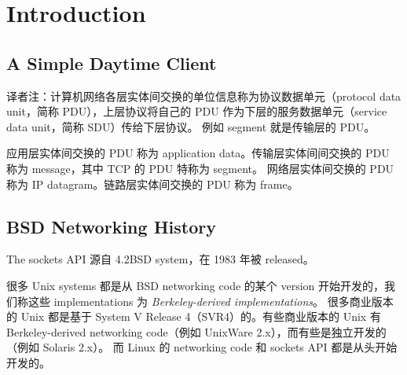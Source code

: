 \section{Introduction}

  \subsection{A Simple Daytime Client}

    译者注：计算机网络各层实体间交换的单位信息称为协议数据单元（protocol data unit，简称 PDU），上层协议将自己的 PDU 作为下层的服务数据单元（service data unit，简称 SDU）传给下层协议。
    例如 segment 就是传输层的 PDU。

    应用层实体间交换的 PDU 称为 application data。传输层实体间间交换的 PDU 称为 message，其中 TCP 的 PDU 特称为 segment。
    网络层实体间交换的 PDU 称为 IP datagram。链路层实体间交换的 PDU 称为 frame。

  \subsection{BSD Networking History}

    The sockets API 源自 4.2BSD system，在 1983 年被 released。
    
    很多 Unix systems 都是从 BSD networking code 的某个 version 开始开发的，我们称这些 implementations 为 \textit{Berkeley-derived implementations}。
    很多商业版本的 Unix 都是基于 System V Release 4（SVR4）的。有些商业版本的 Unix 有 Berkeley-derived networking code（例如 UnixWare 2.x），而有些是独立开发的（例如 Solaris 2.x）。
    而 Linux 的 networking code 和 sockets API 都是从头开始开发的。

